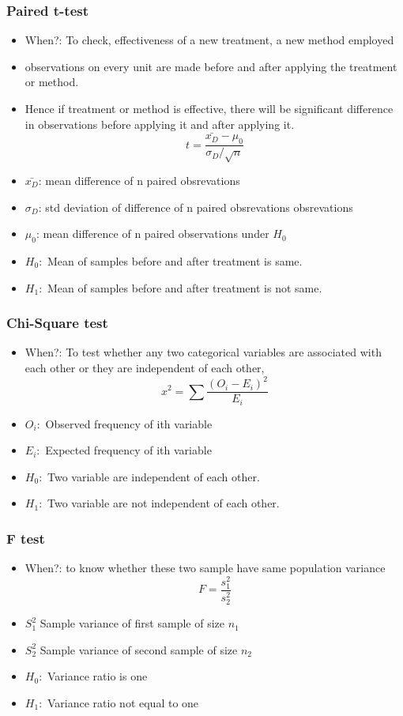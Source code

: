 \begin{frame}[fragile]\frametitle{Paired t-test}
\begin{itemize}
\item When?: To check, effectiveness of a new treatment, a new method 
employed 
\item  observations on  every  unit  are  made  before  and  after  applying  the  treatment  or 
method.  
\item Hence  if  treatment  or  method  is  effective,  there  will  be 
significant  difference  in  observations  before  applying  it  and  after 
applying it. 
$$
t = \frac{\bar{x_D} - \mu_0}{\sigma_D /\sqrt{n}}
$$
\item $\bar{x_D}$: mean difference of n paired obsrevations
\item $\sigma_D$:  std deviation of difference of n paired obsrevations obsrevations
\item $\mu_0$: mean difference of n paired observations under $H_0$
\item $H_0: $ Mean of samples before and after treatment is same. 
\item $H_1:$ Mean of samples before and after treatment is not same.
\end{itemize}
\end{frame}


\begin{frame}[fragile]\frametitle{Chi-Square test}
\begin{itemize}
\item When?: To test whether any 
two  categorical variables  are  associated  with  each  other  or  they  are 
independent  of  each  other,
$$
x^2= \sum \frac{(O_i - E_i)^2}{E_i}
$$
\item $O_i:$ Observed frequency of ith variable
\item $E_i:$ Expected frequency of ith variable
\item $H_0: $ Two variable are independent of each other. 
\item $H_1:$ Two variable are not independent of each other. 
\end{itemize}
\end{frame}

\begin{frame}[fragile]\frametitle{F test}
\begin{itemize}
\item When?: to  know 
whether  these  two  sample  have  same  population  variance
$$
F = \frac{s_1^2}{s_2^2}
$$
\item $S_1^2$ Sample variance of first sample of size $n_1$
\item $S_2^2$ Sample variance of second sample of size $n_2$
\item $H_0: $ Variance ratio is one
\item $H_1:$ Variance ratio not equal to one
\end{itemize}
\end{frame}
